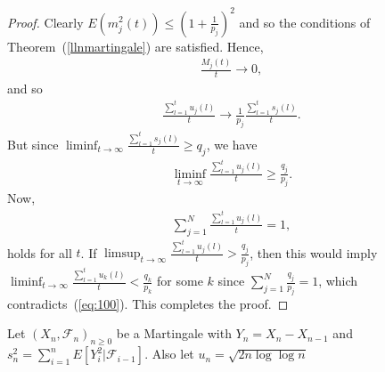 \documentclass[letterpaper, 10 pt, conference]{ieeeconf}
\begin{document}
\begin{proof}
 Clearly $E(m_{j}^{2} (t)  ) \leq (1+\frac{1}{p_{j}})^{2}$ and so the conditions of Theorem~(\ref{llnmartingale}) are satisfied. Hence,
\begin{align}
\frac{M_{j}(t)}{t} \to 0,
\end{align}
and so
\begin{align}
 \frac{\sum_{l=1}^{t}u_{j}(l)}{t} \to \frac{1}{p_{j}}\frac{\sum_{l=1}^{t}s_{j}(l)}{t}.
\end{align}
But since $\liminf_{t\to\infty} \frac{\sum_{l=1}^{t}s_{j}(l)}{t} \geq q_{j}$, we have 
\begin{align}\label{eq:100}
\liminf_{t\to\infty} \frac{\sum_{l=1}^{t}u_{j}(l)}{t} \geq \frac{q_{j} }{p_{j}}.
\end{align}
Now, 
\begin{align*}
\sum_{j=1}^{N}   \frac{\sum_{l=1}^{t}u_{j}(l)}{t} = 1,
\end{align*}
holds for all $t$. If $\limsup_{t\to\infty}   \frac{\sum_{l=1}^{t}u_{j}(l)}{t} >\frac{q_{j}}{p_{j}}$, then this would imply $\liminf_{t\to\infty}   \frac{\sum_{l=1}^{t}u_{k}(l)}{t} <\frac{q_{k}}{p_{k}}$ for some $k$ since $\sum_{j=1}^{N}\frac{q_{j}}{p_{j}} = 1$, which contradicts~(\ref{eq:100}). This completes the proof.
\end{proof}
Let $(X_{n},\mathcal{F}_{n})_{n\geq 0}$ be a Martingale with $Y_{n} = X_{n} - X_{n-1}$ and $s^{2}_{n} =  \sum_{i=1}^{n} E[Y^{2}_{i} | \mathcal{F}_{i-1}     ]$. Also let $u_{n} = \sqrt{2n\log\log n }$
\end{document}
